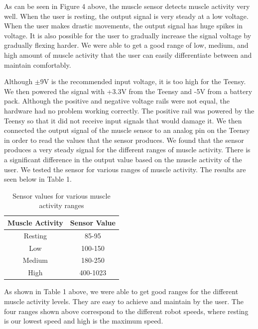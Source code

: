 \documentclass[12pt,scrartcl,titlepage]{article}
\begin{document}
  As can be seen in Figure 4 above, the muscle sensor detects muscle activity very well. When the user is resting, the output signal is very steady at a low voltage. When the user makes drastic movements, the output signal has huge spikes in voltage. It is also possible for the user to gradually increase the signal voltage by gradually flexing harder. We were able to get a good range of low, medium, and high amount of muscle activity that the user can easily differentiate between and maintain comfortably.

  Although $\pm$9V is the recommended input voltage, it is too high for the Teensy. We then powered the signal with +3.3V from the Teensy and -5V from a battery pack. Although the positive and negative voltage rails were not equal, the hardware had no problem working correctly. The positive rail was powered by the Teensy so that it did not receive input signals that would damage it. We then connected the output signal of the muscle sensor to an analog pin on the Teensy in order to read the values that the sensor produces. We found that the sensor produces a very steady signal for the different ranges of muscle activity. There is a significant difference in the output value based on the muscle activity of the user. We tested the sensor for various ranges of muscle activity. The results are seen below in Table 1.

  \begin{table}[h!]
    \begin{center}
      \begin{tabular}{|c|c|}
        \hline
        \textbf{Muscle Activity}&\textbf{Sensor Value}\\
        \hline
        Resting&85-95\\
        \hline
        Low&100-150\\
        \hline
        Medium&180-250\\
        \hline
        High&400-1023\\
        \hline
      \end{tabular}
    \end{center}
    \caption{Sensor values for various muscle activity ranges}
  \end{table}

  As shown in Table 1 above, we were able to get good ranges for the different muscle activity levels. They are easy to achieve and maintain by the user. The four ranges shown above correspond to the different robot speeds, where resting is our lowest speed and high is the maximum speed.
  
\end{document}
